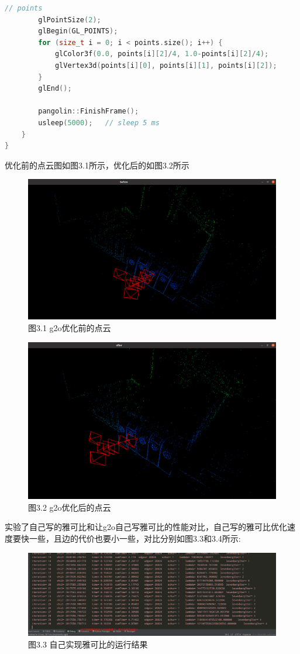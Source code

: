 \documentclass[40pt,a4paper，UTF8]{ctexart}
\numberwithin{equation}{section}
\begin{document}
\begin{lstlisting}[language=C++, caption=Direct\_BA.cpp]
        // points
        glPointSize(2);
        glBegin(GL_POINTS);
        for (size_t i = 0; i < points.size(); i++) {
            glColor3f(0.0, points[i][2]/4, 1.0-points[i][2]/4);
            glVertex3d(points[i][0], points[i][1], points[i][2]);
        }
        glEnd();

        pangolin::FinishFrame();
        usleep(5000);   // sleep 5 ms
    }
}
\end{lstlisting}

优化前的点云图如图3.1所示，优化后的如图3.2所示
\begin{figure}[H]
\centering
\includegraphics[width=4.8in]{ch7_3_1.png} {图3.1 g2o优化前的点云}
\end{figure}

\begin{figure}[H]
\centering
\includegraphics[width=4.8in]{ch7_3_2.png} {图3.2 g2o优化后的点云}
\end{figure}

实验了自己写的雅可比和让g2o自己写雅可比的性能对比，自己写的雅可比优化速度要快一些，且边的代价也要小一些，对比分别如图3.3和3.4所示:
\begin{figure}[H]
\centering
\includegraphics[width=4.8in]{ch7_3_3.png} {图3.3 自己实现雅可比的运行结果}
\end{figure}
\end{document}
